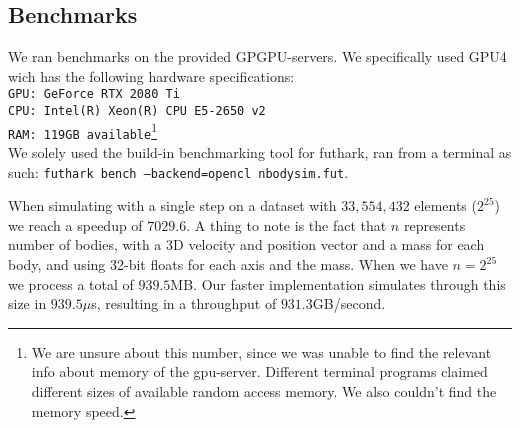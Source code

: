 \subsection{Benchmarks}
We ran benchmarks on the provided GPGPU-servers. We specifically
used GPU4 wich has the following hardware specifications:\\
\texttt{GPU: GeForce RTX 2080 Ti}\\
\texttt{CPU: Intel(R) Xeon(R) CPU E5-2650 v2}\\
\texttt{RAM: 119GB available}\footnote{We are unsure about this number, since we was
unable to find the relevant info about memory of the gpu-server. Different terminal
programs claimed different sizes of available random access memory. We also couldn't
find the memory speed.}\\

We solely used the build-in benchmarking tool for futhark, ran from a terminal
as such: \texttt{futhark bench --backend=opencl nbodysim.fut}.

When simulating with a single step on a dataset with $33,554,432$ elements
($2^{25}$) we reach a speedup of $7029.6$. A thing to note is the fact that
$n$ represents number of bodies, with a 3D velocity and position vector and a
mass for each body, and using 32-bit floats for each axis and the mass. When we
have $n = 2^{25}$ we process a total of $939.5$MB. Our faster implementation
simulates through this size in $939.5\mu$s, resulting in a throughput of
$931.3$GB/second.

\begin{Figure}
  \centering
  \label{fig:eatshit}
\end{Figure}

